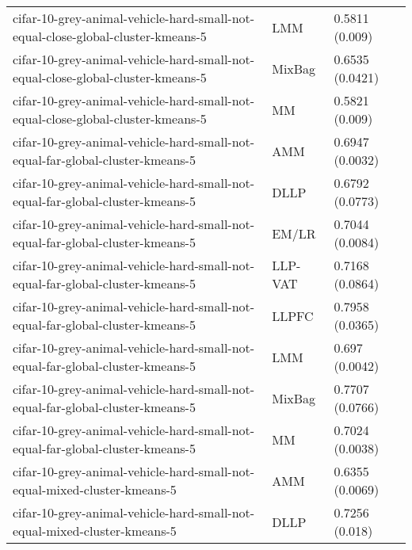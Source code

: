 \begin{longtable}{lll}
                              cifar-10-grey-animal-vehicle-hard-small-not-equal-close-global-cluster-kmeans-5 &       LMM &                        0.5811 (0.009) \\
                              cifar-10-grey-animal-vehicle-hard-small-not-equal-close-global-cluster-kmeans-5 &    MixBag &                       0.6535 (0.0421) \\
                              cifar-10-grey-animal-vehicle-hard-small-not-equal-close-global-cluster-kmeans-5 &        MM &                        0.5821 (0.009) \\
                                cifar-10-grey-animal-vehicle-hard-small-not-equal-far-global-cluster-kmeans-5 &       AMM &                       0.6947 (0.0032) \\
                                cifar-10-grey-animal-vehicle-hard-small-not-equal-far-global-cluster-kmeans-5 &      DLLP &                       0.6792 (0.0773) \\
                                cifar-10-grey-animal-vehicle-hard-small-not-equal-far-global-cluster-kmeans-5 &     EM/LR &                       0.7044 (0.0084) \\
                                cifar-10-grey-animal-vehicle-hard-small-not-equal-far-global-cluster-kmeans-5 &   LLP-VAT &                       0.7168 (0.0864) \\
                                cifar-10-grey-animal-vehicle-hard-small-not-equal-far-global-cluster-kmeans-5 &     LLPFC &                       0.7958 (0.0365) \\
                                cifar-10-grey-animal-vehicle-hard-small-not-equal-far-global-cluster-kmeans-5 &       LMM &                        0.697 (0.0042) \\
                                cifar-10-grey-animal-vehicle-hard-small-not-equal-far-global-cluster-kmeans-5 &    MixBag &                       0.7707 (0.0766) \\
                                cifar-10-grey-animal-vehicle-hard-small-not-equal-far-global-cluster-kmeans-5 &        MM &                       0.7024 (0.0038) \\
                                     cifar-10-grey-animal-vehicle-hard-small-not-equal-mixed-cluster-kmeans-5 &       AMM &                       0.6355 (0.0069) \\
                                     cifar-10-grey-animal-vehicle-hard-small-not-equal-mixed-cluster-kmeans-5 &      DLLP &                        0.7256 (0.018) \\

\end{longtable}
